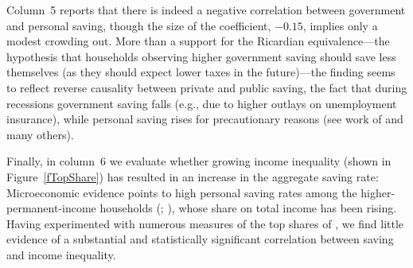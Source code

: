 \documentclass[titlepage]{\econtex}
\newcommand{\jbemph}[1]{{\textbf{\color{jirkasblue}#1}}}
\begin{document}
Column~5 reports that there is indeed a negative correlation between government and personal saving, though the size of the coefficient, $-0.15$, implies only a modest crowding out. More than a support for the Ricardian equivalence---the hypothesis that households observing higher government saving should save less themselves (as they should expect lower taxes in the future)---the finding seems to reflect reverse causality between private and public saving, the fact that during recessions government saving falls (e.g., due to higher outlays on unemployment insurance), while personal saving rises for precautionary reasons (see work of \cite{elmendorfMankiw} and many others).


Finally,  in column~6 we evaluate whether  growing income inequality (shown in Figure~\ref{fTopShare})
 has resulted in an increase in the aggregate saving rate: Microeconomic evidence
 points to high personal saving rates among the higher-permanent-income households
 (\cite{carroll:richsave}; \cite{dszRichSave}), whose share on total income has been rising.  Having experimented with numerous measures of the top shares of \cite{Piketty_Saez2003}, we find little evidence of a substantial and statistically significant correlation between saving and income inequality.

\end{document}

